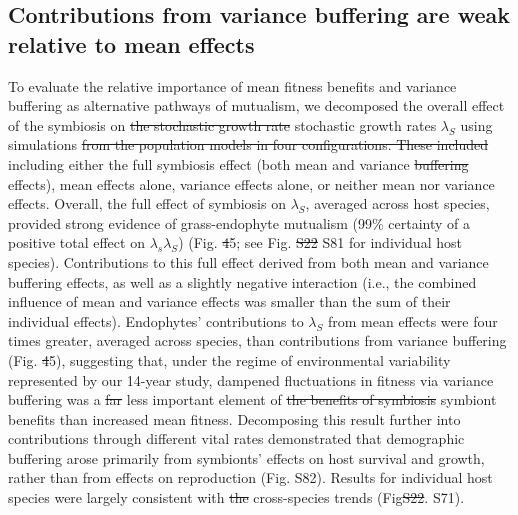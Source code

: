 \documentclass[lineno,sn-nature]{sn-jnl}%
\providecommand{\DIFadd}[1]{{\protect\color{blue}#1}} %
\providecommand{\DIFdel}[1]{{\protect\color{red}\protect\scriptsize\sout{#1}}}
\providecommand{\DIFadd}[1]{{\protect\color{blue}\uwave{#1}}} %
\providecommand{\DIFdel}[1]{{\protect\color{red}\sout{#1}}}                      %
\providecommand{\DIFaddbegin}{} %
\providecommand{\DIFaddend}{} %
\providecommand{\DIFdelbegin}{} %
\providecommand{\DIFdelend}{} %
\newcommand{\DIFscaledelfig}{0.5}
\newlength{\DIFdelgraphicswidth} %
\newlength{\DIFdelgraphicsheight} %
\newcommand{\DIFaddincludegraphics}[2][]{{\color{blue}\fbox{\DIFOincludegraphics[#1]{#2}}}} %
\newcommand{\DIFdelincludegraphics}[2][]{%
\sbox{\DIFdelgraphicsbox}{\DIFOincludegraphics[#1]{#2}}%
\settoboxwidth{\DIFdelgraphicswidth}{\DIFdelgraphicsbox} %
\settoboxtotalheight{\DIFdelgraphicsheight}{\DIFdelgraphicsbox} %
\scalebox{\DIFscaledelfig}{%
\parbox[b]{\DIFdelgraphicswidth}{\usebox{\DIFdelgraphicsbox}\\[-\baselineskip] \rule{\DIFdelgraphicswidth}{0em}}\llap{\resizebox{\DIFdelgraphicswidth}{\DIFdelgraphicsheight}{%
\setlength{\unitlength}{\DIFdelgraphicswidth}%
\begin{picture}(1,1)%
\thicklines\linethickness{2pt} %
{\color[rgb]{1,0,0}\put(0,0){\framebox(1,1){}}}%
{\color[rgb]{1,0,0}\put(0,0){\line( 1,1){1}}}%
{\color[rgb]{1,0,0}\put(0,1){\line(1,-1){1}}}%
\end{picture}%
}\hspace*{3pt}}} %
} %
\DeclareRobustCommand{\DIFaddbegin}{\DIFOaddbegin \let\includegraphics\DIFaddincludegraphics} %
\DeclareRobustCommand{\DIFaddend}{\DIFOaddend \let\includegraphics\DIFOincludegraphics} %
\DeclareRobustCommand{\DIFdelbegin}{\DIFOdelbegin \let\includegraphics\DIFdelincludegraphics} %
\DeclareRobustCommand{\DIFdelend}{\DIFOaddend \let\includegraphics\DIFOincludegraphics} %
\begin{document}
\subsection*{Contributions from variance buffering are weak relative to mean effects}
To evaluate the relative importance of mean fitness benefits and variance buffering as alternative pathways of mutualism, we decomposed  the overall effect of the symbiosis on \DIFdelbegin \DIFdel{the stochastic growth rate }\DIFdelend \DIFaddbegin \DIFadd{stochastic growth rates }\DIFaddend $\lambda_{S}$ using simulations \DIFdelbegin \DIFdel{from the population models in four configurations.
These included }\DIFdelend \DIFaddbegin \DIFadd{including }\DIFaddend either the full symbiosis effect (both mean and variance \DIFdelbegin \DIFdel{buffering }\DIFdelend effects), mean effects alone, variance effects alone, or neither mean nor variance effects. 
Overall, the full effect of symbiosis on $\lambda_{S}$, averaged across host species, provided strong evidence of grass-endophyte mutualism (99\% certainty of a positive total effect on \DIFdelbegin \DIFdel{$\lambda_s$}\DIFdelend \DIFaddbegin \DIFadd{$\lambda_S$}\DIFaddend ) (Fig. \DIFdelbegin \DIFdel{4}\DIFdelend \DIFaddbegin \DIFadd{5}\DIFaddend ; see Fig. \DIFdelbegin \DIFdel{S22 }\DIFdelend \DIFaddbegin \DIFadd{S81 }\DIFaddend for individual host species).
Contributions to this full effect derived from both mean and variance buffering effects, as well as a slightly negative interaction (i.e., the combined influence of mean and variance effects was smaller than the sum of their individual effects). 
Endophytes' contributions to  $\lambda_{S}$ from mean effects were four times greater, averaged across species, than contributions from variance buffering (Fig. \DIFdelbegin \DIFdel{4}\DIFdelend \DIFaddbegin \DIFadd{5}\DIFaddend ), suggesting that, under the regime of environmental variability represented by our 14-year study, dampened fluctuations in fitness via variance buffering was a \DIFdelbegin \DIFdel{far }\DIFdelend less important element of \DIFdelbegin \DIFdel{the benefits of symbiosis }\DIFdelend \DIFaddbegin \DIFadd{symbiont benefits }\DIFaddend than increased mean fitness. 
\DIFaddbegin \DIFadd{Decomposing this result further into contributions through different vital rates demonstrated that demographic buffering arose primarily from symbionts' effects on host survival and growth, rather than from effects on reproduction (Fig. S82).
}\DIFaddend Results for individual host species were largely consistent with \DIFdelbegin \DIFdel{the }\DIFdelend cross-species trends (Fig\DIFdelbegin \DIFdel{S22}\DIFdelend \DIFaddbegin \DIFadd{. S71}\DIFaddend ). 
\end{document}
